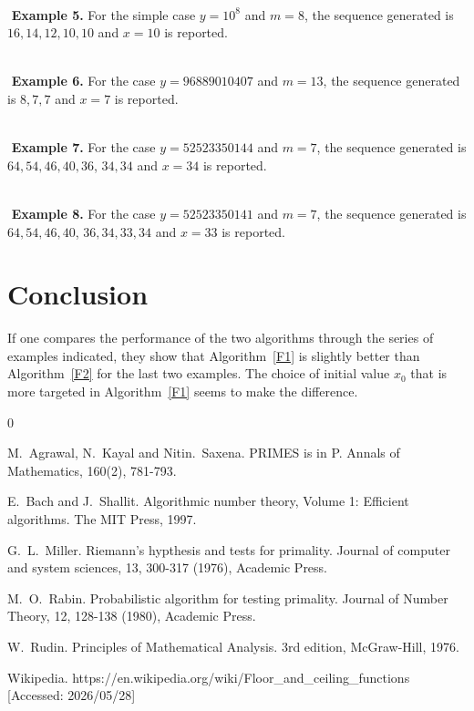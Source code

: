 \documentclass[11pt]{article}
\begin{document}
$ $ \\ $ $
{\bf Example 5.}
For the simple case $y=10^8$ and $m=8$,
the sequence generated is $16,14,12,10,10$ and
$x=10$ is reported.

$ $ \\ $ $
{\bf Example 6.}
For the case $y=96889010407$ and $m=13$,
the sequence generated is $8,7,7$ 
and $x=7$ is reported.

$ $ \\ $ $
{\bf Example 7.}
For the case $y=52523350144$ and $m=7$,
the sequence generated is $64, 54, 46, 40, 36$,
$34, 34$
and $x=34$ is reported.

$ $ \\ $ $
{\bf Example 8.}
For the case $y=52523350141$ and $m=7$,
the sequence generated is $64, 54, 46, 40$, 
$36, 34, 33, 34$
and $x=33$ is reported.


\section{Conclusion}

If one compares the  performance of the two
algorithms through the series of examples indicated,
they show that Algorithm~\ref{F1} is
slightly better than Algorithm~\ref{F2} for the last two
examples. The choice of initial value $x_0$ that is more
targeted in Algorithm~\ref{F1} seems to make the difference.


\newpage
\begin{thebibliography}{0}
%


M.~Agrawal, N.~Kayal and Nitin.~Saxena.
PRIMES is in P. 
Annals of Mathematics, 160(2), 781-793.

E.~Bach and J.~Shallit.
Algorithmic number theory, Volume 1: Efficient algorithms.
The MIT Press, 1997.

G.~L.~Miller.
Riemann's hypthesis and tests for primality.
Journal of computer and system sciences, 13, 300-317 (1976),
Academic Press.

M.~O.~Rabin.
Probabilistic algorithm for testing primality.
Journal of Number Theory, 12, 128-138 (1980), Academic Press.

W.~Rudin.
Principles of Mathematical Analysis. 
3rd edition, McGraw-Hill, 1976.

Wikipedia.
{https://en.wikipedia.org/wiki/Floor\_and\_ceiling\_functions}
[Accessed: 2026/05/28]


\end{thebibliography}

\end{document}
